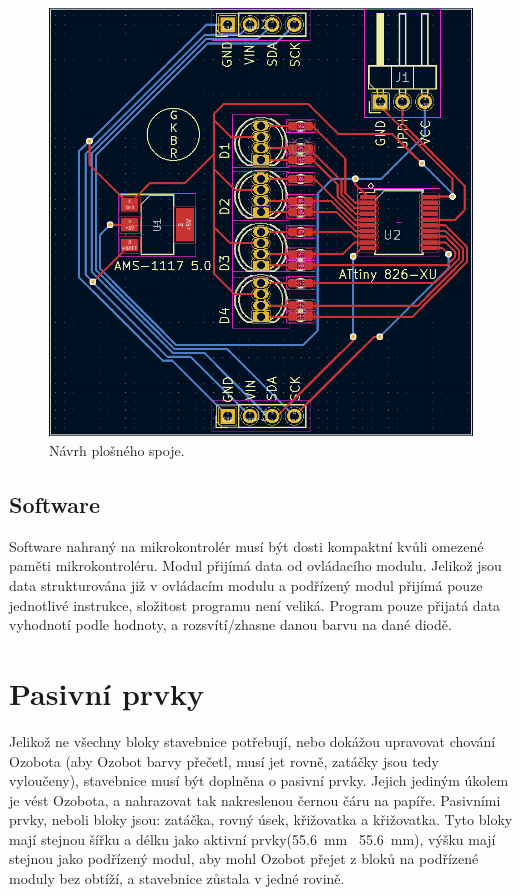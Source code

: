 \begin{figure}[H]
        \begin{center}
          \includegraphics[scale=0.55]{images/navrh_plosny.png}
          \caption{Návrh plošného spoje.}
          \end{center}
          \label{fig:pcb-design}
        \end{figure}

        \subsection{Software}
        Software nahraný na mikrokontrolér musí být dosti kompaktní kvůli omezené paměti mikrokontroléru. Modul přijímá data od ovládacího modulu. Jelikož jsou data strukturována již v ovládacím modulu a podřízený modul přijímá pouze jednotlivé instrukce, složitost programu není veliká. Program pouze přijatá data vyhodnotí podle hodnoty, a rozsvítí/zhasne danou barvu na dané diodě. 

    \section{Pasivní prvky}
        Jelikož ne všechny bloky stavebnice potřebují, nebo dokážou upravovat chování Ozobota (aby Ozobot barvy přečetl, musí jet rovně, zatáčky jsou tedy vyloučeny), stavebnice musí být doplněna o pasivní prvky. Jejich jediným úkolem je vést Ozobota, a nahrazovat tak nakreslenou černou čáru na papíře. Pasivními prvky, neboli bloky jsou: zatáčka, rovný úsek, křižovatka  a křižovatka. Tyto bloky mají stejnou šířku a délku jako aktivní prvky(\SI{55,6}{mm} \texttimes~\SI{55,6}{mm}), výšku mají stejnou jako podřízený modul, aby mohl Ozobot přejet z bloků na podřízené moduly bez obtíží, a stavebnice zůstala v jedné rovině. 

